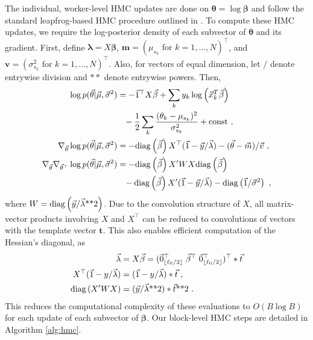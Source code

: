 The individual, worker-level HMC updates are done on $\bm \theta = \log \bm \beta$ and follow the standard leapfrog-based HMC procedure outlined in \citet{Neal2010}.
To compute these HMC updates, we require the log-posterior density of each subvector of $\bm \theta$ and its gradient.
First, define $\bm \lambda = X \bm \beta$, $\bm m = (\mu_{s_k} \mbox{ for } k = 1, \ldots, N)^\top$, and $\bm v = (\sigma^2_{s_k} \mbox{ for } k = 1, \ldots, N)^\top$.
Also, for vectors of equal dimension, let $/$ denote entrywise division and $**$ denote entrywise powers.
Then,
\begin{align}
\log p(\bm \theta | \bm \mu, \bm \sigma^2) &= -\bm 1^\top X \bm \beta + \sum_k y_k \log \left( \bm x_k^T \bm \beta \right) \\
\nonumber
&\phantom{=} - \frac{1}{2} \sum_k \frac{(\theta_k - \mu_{s_k})^2}{\sigma^2_{s_k}} + \mathrm{const} \ , \\
\nabla_{\bm \theta} \log p(\bm \theta | \bm \mu, \bm \sigma^2) &= -\diag{\bm \beta} X^\top (\bm 1 - \bm y / \bm \lambda) - (\bm \theta - \bm m) / \bm v \ , \\
\nabla_{\bm \theta} \nabla_{\bm \theta^\top} \log p(\bm \theta | \bm \mu, \bm \sigma^2) &= -\diag{\bm \beta} X'WX \diag{\bm \beta} \\
\nonumber
&\phantom{=} - \diag{\bm \beta} X' (\bm 1 - \bm y
/ \bm \lambda) - \diag{\bm 1 / \bm \sigma^2} \label{eq:hessian} \ ,
\end{align}
where $W = \mathrm{diag}\left(\vec y / \vec \lambda\mbox{**}2\right)$.
Due to the convolution structure of $X$, all matrix-vector products involving $X$ and $X^\top$ can be reduced to convolutions of vectors with the template vector $\bm t$.
This also enables efficient computation of the Hessian's diagonal, as
\begin{align}
\vec \lambda &= X \vec \beta = (\vec 0_{\lfloor \ell_0 / 2 \rfloor}^\top \; \vec \beta^\top \; \vec 0_{\lfloor \ell_0 / 2 \rfloor}^\top)^\top * \vec t \\
X^\top (\vec 1 - y / \vec \lambda) &= (\vec 1 - y / \vec \lambda) * \vec t \ , \\
\mathrm{diag}\left(X'WX\right) &= (\vec y / \vec \lambda\mbox{**}2) * \vec t\mbox{**}2 \ .
\end{align}
%
This reduces the computational complexity of these evaluations to $O(B \log B)$ for each update of each subvector of $\bm \beta$.
Our block-level HMC steps are detailed in Algorithm \ref{alg:hmc}.
%
